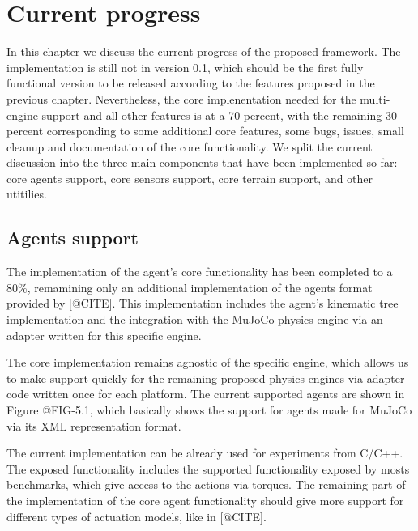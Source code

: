 
\chapter{Current progress}
\label{ch:current_progress}



In this chapter we discuss the current progress of the proposed framework. The implementation
is still not in version 0.1, which should be the first fully functional version to be released
according to the features proposed in the previous chapter. Nevertheless, the core implenentation
needed for the multi-engine support and all other features is at a 70 percent, with the remaining
30 percent corresponding to some additional core features, some bugs, issues, small cleanup and 
documentation of the core functionality. We split the current discussion into the three main 
components that have been implemented so far: core agents support, core sensors support, core 
terrain support, and other utitilies.

\section{Agents support}

The implementation of the agent's core functionality has been completed to a 80\%,
remamining only an additional implementation of the agents format provided by [@CITE].
This implementation includes the agent's kinematic tree implementation and the integration 
with the MuJoCo physics engine via an adapter written for this specific engine.

The core implementation remains agnostic of the specific engine, which allows us
to make support quickly for the remaining proposed physics engines via adapter code
written once for each platform. The current supported agents are shown in Figure @FIG-5.1,
which basically shows the support for agents made for MuJoCo via its XML representation format.

The current implementation can be already used for experiments from C/C++. The exposed
functionality includes the supported functionality exposed by mosts benchmarks, which
give access to the actions via torques. The remaining part of the implementation of the core
agent functionality should give more support for different types of actuation models, like in [@CITE].

